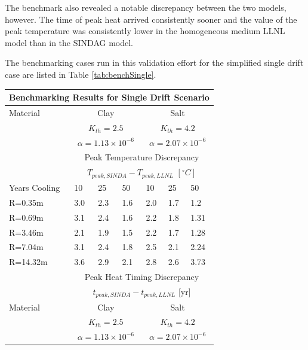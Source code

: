 \documentclass{anstrans}
\begin{document}
The benchmark also revealed a notable discrepancy between the two models, 
however. The time of peak heat arrived consistently sooner and the value of the 
peak temperature was consistently lower in the homogeneous medium \gls{LLNL} 
model than in the \gls{SINDAG} model. 

The benchmarking cases run in this validation effort for the simplified single 
drift case are listed in Table \ref{tab:benchSingle}. 

\begin{table}
  \centering
  \footnotesize{
  \begin{tabular}{|l|l|l|l|l|l|l|}
    \multicolumn{7}{c}{\textbf{Benchmarking Results for Single Drift 
    Scenario}}\\
    \hline
    Material & \multicolumn{3}{|c|}{Clay} & \multicolumn{3}{|c|}{Salt}\\ & 
    \multicolumn{3}{|c|}{$K_{th}=2.5$} & \multicolumn{3}{|c|}{$K_{th}=4.2$}\\ & 
    \multicolumn{3}{|c|}{$\alpha=1.13\times10^{-6}$} & 
    \multicolumn{3}{|c|}{$\alpha=2.07\times10^{-6}$}\\ 
    \hline
    & \multicolumn{6}{|c|}{Peak Temperature Discrepancy}\\ 
    & \multicolumn{6}{|c|}{$T_{peak,SINDA}-T_{peak,LLNL}$ $[^{\circ}C]$} \\
    \hline
    Years Cooling  & 10     & 25      & 50      & 10     & 25     & 50\\
    \hline
     R=0.35m  & 3.0   & 2.3     & 1.6    & 2.0   & 1.7   & 1.2\\
     R=0.69m  & 3.1   & 2.4    & 1.6    & 2.2    & 1.8   & 1.31\\
     R=3.46m  & 2.1   & 1.9    & 1.5    & 2.2   & 1.7    & 1.28\\
     R=7.04m  & 3.1   & 2.4     & 1.8    & 2.5   & 2.1   & 2.24\\
     R=14.32m & 3.6   & 2.9    & 2.1    & 2.8   & 2.6   & 3.73\\
    \hline
    & \multicolumn{6}{|c|}{Peak Heat Timing Discrepancy}\\ 
    & \multicolumn{6}{|c|}{ $t_{peak,SINDA}-t_{peak,LLNL}$ [yr]} \\
    \hline
    Material & \multicolumn{3}{|c|}{Clay} & \multicolumn{3}{|c|}{Salt}\\ & 
    \multicolumn{3}{|c|}{$K_{th}=2.5$} & \multicolumn{3}{|c|}{$K_{th}=4.2$}\\ & 
    \multicolumn{3}{|c|}{$\alpha=1.13\times10^{-6}$} & 
    \multicolumn{3}{|c|}{$\alpha=2.07\times10^{-6}$}\\ \hline

\end{tabular}}
\end{table}
\end{document}
